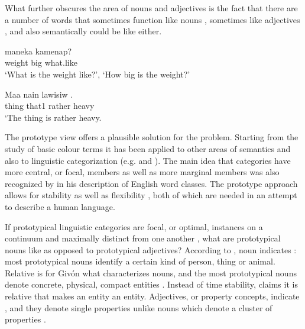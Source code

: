 What further obscures the area of nouns and adjectives is the fact that there are a number of words that sometimes function like nouns , sometimes like adjectives , and also semantically could be like either.

\ea%
\label{ex:3:x20}
\gll {} maneka kamenap? \\
weight big what.like\\
\glt`What is the weight like?', `How big is the weight?'
\z

\ea%
\label{ex:3:x21}
\gll Maa nain lawisiw . \\
thing that1 rather heavy\\
\glt`The thing is rather heavy.
\z

The prototype view offers a plausible solution for the problem. Starting from the study of basic colour terms \citep{BerlinEtAl1969} it has been applied to other areas of semantics and also to linguistic categorization (e.g.\citealt{Wierzbicka1986,Taylor1989} and \citealt{Frawley1992}). The main idea that categories have more central, or focal, members as well as more marginal members was also recognized by \citet{Crystal1967} in his description of English word classes. The prototype approach allows for stability as well as flexibility \citep[53]{Taylor1989}, both of which are needed in an attempt to describe a human language.

If prototypical linguistic categories are focal, or optimal, instances on a continuum \citep[321]{Seiler1978} and maximally distinct from one another \citep[709]{HopperEtAl1984}%
, what are prototypical nouns like as opposed to prototypical adjectives? According to \citet{Wierzbicka1986}, noun indicates : most prototypical nouns identify a certain kind of person, thing or animal. Relative  is for Giv\'on what characterizes nouns, and the most prototypical nouns denote concrete, physical, compact entities \citeyear[151]{Givon1984}. Instead of time stability, \citet[66]{Frawley1992} claims it is relative \textstyleEmphasizedWords{} that makes an entity an entity. Adjectives, or property concepts, indicate , and they denote single properties unlike nouns which denote a cluster of properties \citep{Wierzbicka1986}.

